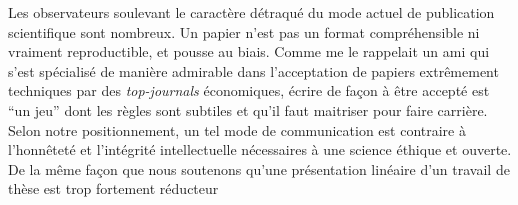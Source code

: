 
Les observateurs soulevant le caractère détraqué du mode actuel de publication scientifique sont nombreux. Un papier n'est pas un format compréhensible ni vraiment reproductible, et pousse au biais. Comme me le rappelait un ami qui s'est spécialisé de manière admirable dans l'acceptation de papiers extrêmement techniques par des \emph{top-journals} économiques, écrire de façon à être accepté est ``un jeu'' dont les règles sont subtiles et qu'il faut maitriser pour faire carrière. Selon notre positionnement, un tel mode de communication est contraire à l'honnêteté et l'intégrité intellectuelle nécessaires à une science éthique et ouverte. De la même façon que nous soutenons qu'une présentation linéaire d'un travail de thèse est trop fortement réducteur















